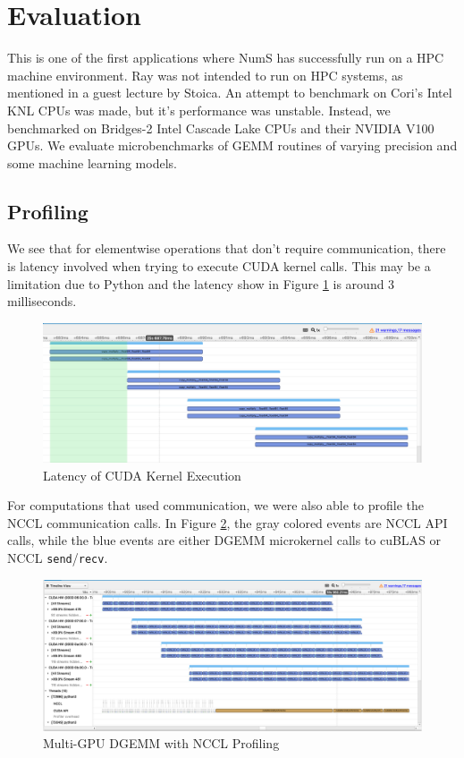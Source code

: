 \documentclass{article}
\begin{document}
\section{Evaluation}
This is one of the first applications where NumS has successfully run on a HPC machine environment. Ray was not intended to run on HPC systems, as mentioned in a guest lecture by Stoica. \cite{ray-lecture} An attempt to benchmark on Cori's Intel KNL CPUs was made, but it's performance was unstable. Instead, we benchmarked on Bridges-2 Intel Cascade Lake CPUs and their NVIDIA V100 GPUs. We evaluate microbenchmarks of GEMM routines of varying precision and some machine learning models.

\subsection{Profiling}
We see that for elementwise operations that don't require communication, there is latency involved when trying to execute CUDA kernel calls. This may be a limitation due to Python and the latency show in Figure \ref{fig:stream} is around 3 milliseconds.

\begin{figure}
	\centerline{\includegraphics[width=6in]{figures/stream.png}}
	\caption{Latency of CUDA Kernel Execution}
	\label{fig:stream}
\end{figure}

For computations that used communication, we were also able to profile the NCCL communication calls. In Figure \ref{fig:nccl-dgemm}, the gray colored events are NCCL API calls, while the blue events are either DGEMM microkernel calls to cuBLAS or NCCL \verb|send|/\verb|recv|.

\begin{figure}
	\centerline{\includegraphics[width=6in]{figures/nccl-dgemm.png}}
	\caption{Multi-GPU DGEMM with NCCL Profiling}
	\label{fig:nccl-dgemm}
\end{figure}
\end{document}
